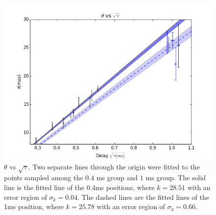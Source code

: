 \documentclass[useAMS,usenatbib]{mn2e}
\begin{document}
\begin{figure}
\centering
\includegraphics[width=1.0\linewidth, angle=0]{Theta_tau.png}
\caption{${\theta}$ vs ${\sqrt{\tau}}$. Two separate lines through the origin were fitted to the points sampled among the $0.4$ ms group and $1$ ms group. The solid line is the fitted line of the 0.4ms positions, where $k=28.51$ with an error region of $\sigma_k=0.04$. The dashed lines are the fitted lines of the 1ms position, where $k=25.78$ with an error region of $\sigma_k=0.66$.
}
\label{thetatau}
\end{figure}
\end{document}
